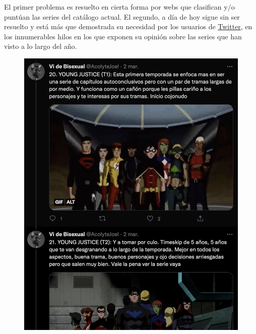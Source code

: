 El primer problema es resuelto en cierta forma por webs que clasifican y/o puntúan las series del catálogo actual. El segundo, a día de hoy sigue sin ser resuelto y está más que demostrada su necesidad por los usuarios de \href{https://twitter.com}{Twitter}, en los innumerables hilos en los que exponen su opinión sobre las series que han visto a lo largo del año.
\begin{figure}[H]
	\centering	
	\includegraphics[scale=0.25]{img/twitter-thread-1.png}

\end{figure}
